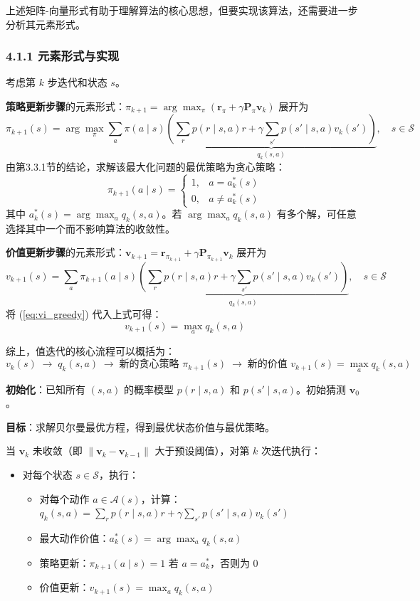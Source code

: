 \documentclass[UTF8]{article}
\begin{document}
上述矩阵-向量形式有助于理解算法的核心思想，但要实现该算法，还需要进一步分析其元素形式。

\subsubsection*{4.1.1 元素形式与实现}

考虑第 $k$ 步迭代和状态 $s$。

\textbf{策略更新步骤}的元素形式：$\pi_{k+1} = \arg\max_\pi (\boldsymbol{r}_\pi + \gamma \boldsymbol{P}_\pi \boldsymbol{v}_k)$ 展开为
\[
\pi_{k+1}(s) = \arg\max_{\pi} \sum_{a} \pi(a \mid s) \underbrace{\left( \sum_{r} p(r \mid s,a) r + \gamma \sum_{s'} p(s' \mid s,a) v_k(s') \right)}_{q_k(s,a)}, \quad s \in \mathcal{S}
\]
由第3.3.1节的结论，求解该最大化问题的最优策略为贪心策略：
\begin{equation}
\pi_{k+1}(a \mid s) =
\begin{cases}
1, & a = a_k^*(s) \\
0, & a \neq a_k^*(s)
\end{cases}
\label{eq:vi_greedy}
\end{equation}
其中 $a_k^*(s) = \arg\max_a q_k(s,a)$。若 $\arg\max_a q_k(s,a)$ 有多个解，可任意选择其中一个而不影响算法的收敛性。

\textbf{价值更新步骤}的元素形式：$\boldsymbol{v}_{k+1} = \boldsymbol{r}_{\pi_{k+1}} + \gamma \boldsymbol{P}_{\pi_{k+1}} \boldsymbol{v}_k$ 展开为
\[
v_{k+1}(s) = \sum_{a} \pi_{k+1}(a \mid s) \underbrace{\left( \sum_{r} p(r \mid s,a) r + \gamma \sum_{s'} p(s' \mid s,a) v_k(s') \right)}_{q_k(s,a)}, \quad s \in \mathcal{S}
\]
将 (\ref{eq:vi_greedy}) 代入上式可得：
\[
v_{k+1}(s) = \max_{a} q_k(s,a)
\]

综上，值迭代的核心流程可以概括为：
\[
v_k(s) \;\to\; q_k(s,a) \;\to\; \text{新的贪心策略 } \pi_{k+1}(s) \;\to\; \text{新的价值 } v_{k+1}(s) = \max_a q_k(s,a)
\]

\begin{algobox}[4.1 值迭代算法]
\textbf{初始化}：已知所有 $(s,a)$ 的概率模型 $p(r \mid s,a)$ 和 $p(s' \mid s,a)$。初始猜测 $\boldsymbol{v}_0$。

\textbf{目标}：求解贝尔曼最优方程，得到最优状态价值与最优策略。

当 $\boldsymbol{v}_k$ 未收敛（即 $\|\boldsymbol{v}_k - \boldsymbol{v}_{k-1}\|$ 大于预设阈值），对第 $k$ 次迭代执行：
\begin{itemize}
    \item 对每个状态 $s \in \mathcal{S}$，执行：
    \begin{itemize}
        \item 对每个动作 $a \in \mathcal{A}(s)$，计算：
        \quad $q_k(s,a) = \sum_{r} p(r \mid s,a) r + \gamma \sum_{s'} p(s' \mid s,a) v_k(s')$
        \item 最大动作价值：$a_k^*(s) = \arg\max_a q_k(s,a)$
        \item 策略更新：$\pi_{k+1}(a \mid s) = 1$ 若 $a = a_k^*$，否则为 $0$
        \item 价值更新：$v_{k+1}(s) = \max_a q_k(s,a)$
    \end{itemize}
\end{itemize}
\end{algobox}
\end{document}
